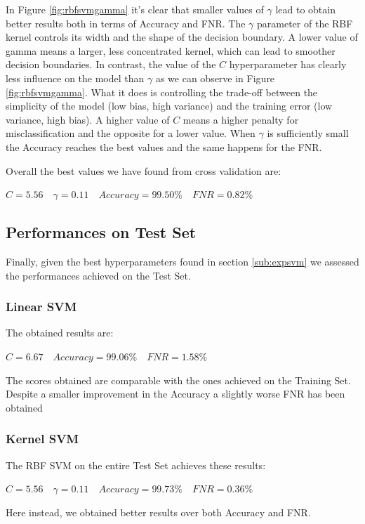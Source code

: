 \documentclass[twocolumn, switch]{article} %
\begin{document}
In Figure \ref{fig:rbfsvmgamma} it's clear that smaller values of $\gamma$ lead to obtain better results both in terms of Accuracy and FNR. The $\gamma$ parameter of the RBF kernel controls its width and the shape of the decision boundary. A lower value of gamma means a larger, less concentrated kernel, which can lead to smoother decision boundaries.\newline
In contrast, the value of the $C$ hyperparameter has clearly less influence on the model than $\gamma$ as we can observe in Figure \ref{fig:rbfsvmgamma}. What it does is controlling the trade-off between the simplicity of the model (low bias, high variance) and the training error (low variance, high bias). A higher value of $C$ means a higher penalty for misclassification and the opposite for a lower value.
When $\gamma$ is sufficiently small the Accuracy reaches the best values and the same happens for the FNR.

Overall the best values we have found from cross validation are:
\begin{center}
	$C=5.56\quad\gamma=0.11 \quad Accuracy=99.50\% \quad FNR=0.82\%$
\end{center}

\subsection{Performances on Test Set}
Finally, given the best hyperparameters found in section \ref{sub:expsvm} we assessed the performances achieved on the Test Set.
\subsubsection{Linear SVM}
The obtained results are:
\begin{center}
	$C=6.67 \quad Accuracy=99.06\% \quad FNR=1.58\%$
\end{center}
The scores obtained are comparable with the ones achieved on the Training Set. Despite a smaller improvement in the Accuracy a slightly worse FNR has been obtained

\subsubsection{Kernel SVM}
The RBF SVM on the entire Test Set achieves these results:
\begin{center}
	$C=5.56 \quad \gamma=0.11 \quad Accuracy=99.73\% \quad FNR=0.36\%$
\end{center}
Here instead, we obtained better results over both Accuracy and FNR.
\end{document}
